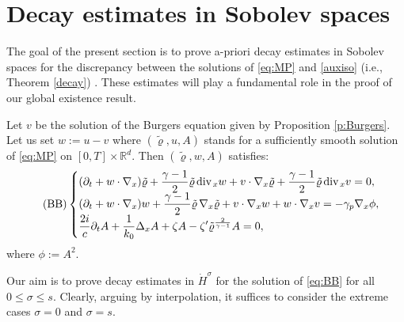 \documentclass[11pt,twoside]{amsart}
\newcommand\R{\mathbb{R}}
\newcommand{\ds}{\displaystyle}
\renewcommand{\div}{\mbox{\rm div}\;\!}
\begin{document}
 

\section{Decay estimates in Sobolev spaces}\label{aux}

The goal of the present section is to prove  
a-priori  decay estimates in Sobolev spaces for the discrepancy between  
the solutions of \eqref{eq:MP}  and \eqref{auxiso} (i.e., Theorem \ref{decay}) . These estimates  will play a fundamental role 
in the proof of our global existence result.  




\bigskip 

Let  $v$ be the solution of the Burgers equation given by Proposition \ref{p:Burgers}. 
Let us set   $w:=u-v$ where $(\tilde \varrho,u,A)$ stands for a sufficiently smooth solution of \eqref{eq:MP} on $[0,T]\times\R^d.$ 
Then $(\tilde\varrho,w,A)$ satisfies:
\begin{align}\tag{BB}
\begin{cases}
\ds (\partial_t+w\cdot\nabla_x)\tilde\varrho+\frac{\gamma-1}2\tilde \varrho\,\div_x w+v\cdot\nabla_x\tilde\varrho+\frac{\gamma-1}2\tilde\varrho\,\div_x v=0,\\ 
\ds (\partial_t+w\cdot\nabla_x)w+\frac{\gamma-1}2\tilde\varrho\,\nabla_x\tilde \varrho+v\cdot\nabla_x w+w\cdot\nabla_x v=-\gamma_p\nabla_x \phi,\\
\ds \frac{2i}{c}\partial_t A+\frac{1}{k_0}\Delta_x A
+\zeta A
-\zeta'\tilde\varrho^{\frac{2}{\gamma-1}} A=0,
\end{cases}\label{eq:BB}
\end{align} 
where $\phi:=A^2$.

Our aim is to prove decay estimates in $\dot H^\sigma$ for the solution of \eqref{eq:BB} for all $0\leq\sigma\leq s.$
Clearly, arguing by interpolation, it suffices to consider the extreme cases $\sigma=0$ and $\sigma=s.$

\medbreak
\end{document}
